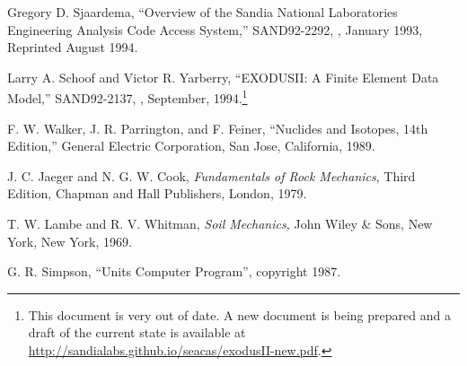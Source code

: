 \begin{thebibliography}{9}

Gregory D. Sjaardema,
``Overview of the Sandia National Laboratories Engineering Analysis Code Access System,''
SAND92-2292,
\SNLA,
January 1993, Reprinted August 1994.

Larry A. Schoof and Victor R. Yarberry,
``EXODUSII: A Finite Element Data Model,''
SAND92-2137,
\SNLA,
September, 1994.\footnote{This document is very out of date.  A new
document is being prepared and a draft of the current state is
available at \url{http://sandialabs.github.io/seacas/exodusII-new.pdf}.}

F. W. Walker, J. R. Parrington, and F. Feiner, ``Nuclides and
Isotopes, 14th Edition,'' General Electric Corporation, San Jose, California, 1989.

J. C. Jaeger and N. G. W. Cook, \textit{Fundamentals of Rock
Mechanics}, Third Edition, Chapman and Hall Publishers, London, 1979.

T. W. Lambe and R. V. Whitman, \textit{Soil Mechanics,} John
Wiley \& Sons, New York, New York, 1969.

G. R. Simpson, ``Units Computer Program'', copyright 1987.


\end{thebibliography}
